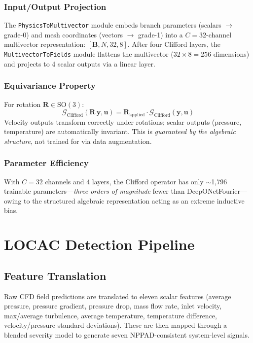 \documentclass[conference]{IEEEtran}
\begin{document}
\subsubsection{Input/Output Projection}
The \texttt{PhysicsToMultivector} module embeds branch parameters (scalars $\to$ grade-0) and mesh coordinates (vectors $\to$ grade-1) into a $C = 32$-channel multivector representation: $[\bm{B}, N, 32, 8]$. After four Clifford layers, the \texttt{MultivectorToFields} module flattens the multivector ($32 \times 8 = 256$ dimensions) and projects to 4 scalar outputs via a linear layer.

\subsubsection{Equivariance Property}
For rotation $\bm{R} \in \text{SO}(3)$:
\begin{equation}
\mathcal{G}_\text{Clifford}(\bm{R}\,\bm{y}, \bm{u}) = \bm{R}_\text{applied} \cdot \mathcal{G}_\text{Clifford}(\bm{y}, \bm{u})
\label{eq:equivariance}
\end{equation}
Velocity outputs transform correctly under rotations; scalar outputs (pressure, temperature) are automatically invariant. This is \emph{guaranteed by the algebraic structure}, not trained for via data augmentation.

\subsubsection{Parameter Efficiency}
With $C = 32$ channels and 4 layers, the Clifford operator has only $\sim$1,796 trainable parameters---\emph{three orders of magnitude} fewer than DeepONetFourier---owing to the structured algebraic representation acting as an extreme inductive bias.

\section{LOCAC Detection Pipeline}
\label{sec:pipeline}

\subsection{Feature Translation}

Raw CFD field predictions are translated to eleven scalar features (average pressure, pressure gradient, pressure drop, mass flow rate, inlet velocity, max/average turbulence, average temperature, temperature difference, velocity/pressure standard deviations). These are then mapped through a blended severity model to generate seven NPPAD-consistent system-level signals.
\end{document}

